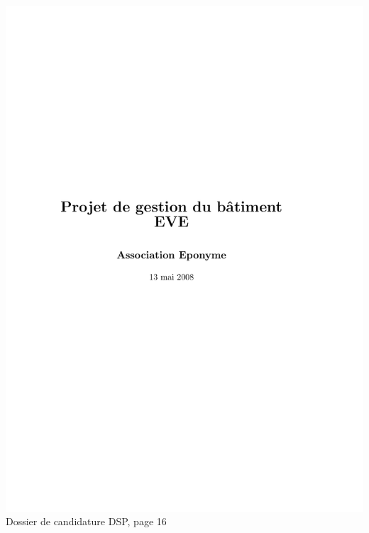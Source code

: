 \includegraphics[scale=0.85,trim=20mm 20mm 20mm 20mm,clip,page=16]{annexes/candidature_dsp.pdf} \\
Dossier de candidature DSP, page 16
\newpage
